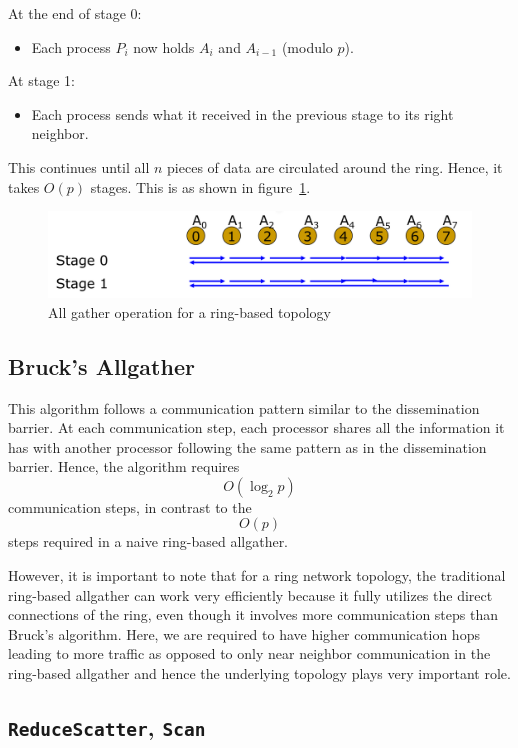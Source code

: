 \documentclass[12pt]{book}
\begin{document}
At the end of stage 0:
\begin{itemize}
    \item Each process $P_i$ now holds $A_i$ and $A_{i-1}$ (modulo $p$).
\end{itemize}

At stage 1:
\begin{itemize}
    \item Each process sends what it received in the previous stage to its right neighbor.
\end{itemize}

This continues until all $n$ pieces of data are circulated around the ring. Hence, it takes $O(p)$ stages. This is as shown in figure~\ref{fig:allgather_examp}.
\begin{figure}[ht]
    \centering
    \includegraphics[width=0.75\linewidth]{images/allgather_examp.png}
    \caption{All gather operation for a ring-based topology}
    \label{fig:allgather_examp}
\end{figure}


\subsection*{Bruck's Allgather}

This algorithm follows a communication pattern similar to the dissemination barrier. At each communication step, each processor shares all the information it has with another processor following the same pattern as in the dissemination barrier. 
Hence, the algorithm requires 
\[
O(\log_2 p)
\]
communication steps, in contrast to the 
\[
O(p)
\]
steps required in a naive ring-based allgather.

However, it is important to note that for a ring network topology, the traditional ring-based allgather can work very efficiently because it fully utilizes the direct connections of the ring, even though it involves more communication steps 
than Bruck's algorithm. Here, we are required to have higher communication hops leading to more traffic as opposed to only near neighbor communication in the ring-based allgather and hence the underlying topology plays very important role. 

\subsection{\texttt{ReduceScatter}, \texttt{Scan}}
\end{document}
